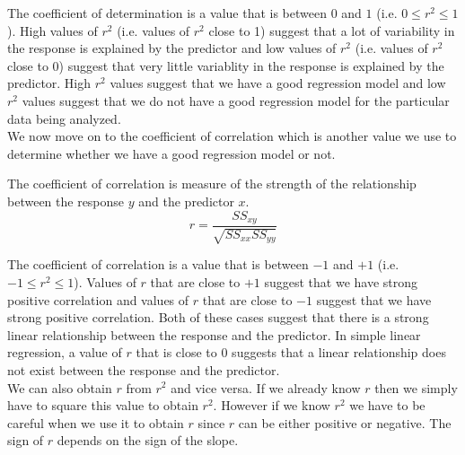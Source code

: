 The coefficient of determination is a value that is between $0$ and $1$
(i.e. $0 \leq r^{2} \leq 1$).
High values of $r^{2}$ (i.e. values of $r^{2}$ close to 1) suggest that 
a lot of variability in the response is explained by the predictor 
and low values of $r^{2}$ (i.e. values of $r^{2}$ close to 0) suggest that 
very little variablity in the response is explained by the predictor.
High $r^{2}$ values suggest that we have a good regression model
and low $r^{2}$ values suggest that we do not have a good regression model
for the particular data being analyzed.\\

We now move on to the coefficient of correlation
which is another value we use to determine whether
we have a good regression model or not.


\begin{definition}
The coefficient of correlation is measure of the strength of the relationship between
the response $y$ and the predictor $x$.
	\begin{equation}
	r	=	\frac{ SS_{xy} }{ \sqrt{SS_{xx} SS_{yy} } }
	\end{equation}
\end{definition}
\hfill

The coefficient of correlation is a value that is between $-1$ and $+1$
(i.e. $-1 \leq r^{2} \leq 1$).
Values of $r$ that are close to $+1$ suggest that we have strong positive correlation
and values of $r$ that are close to $-1$ suggest that we have strong positive correlation.
Both of these cases suggest that there is a strong linear relationship between 
the response and the predictor.
In simple linear regression, a value of $r$ that is close to 0 suggests that 
a linear relationship does not exist between the response and the predictor.\\


We can also obtain $r$ from $r^{2}$ and vice versa.
If we already know $r$ then we simply have to square this value
to obtain $r^{2}$.
However if we know $r^{2}$ we have to be careful when we
use it to obtain $r$ since $r$ can be either positive or negative.
The sign of $r$ depends on the sign of the slope.

